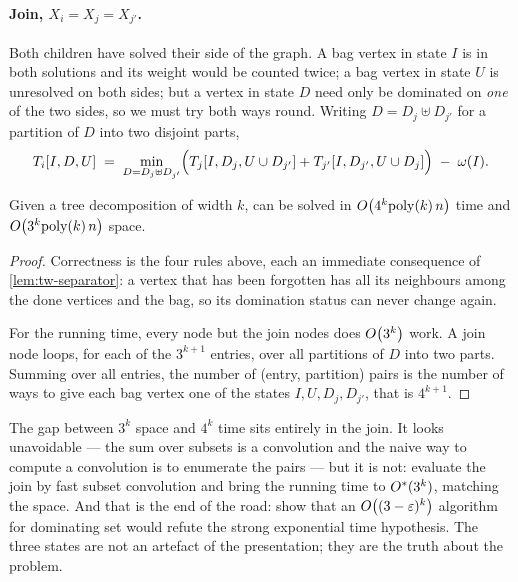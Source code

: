 \paragraph{Join, $X_i = X_j = X_{j'}$.} Both children have solved their side of
the graph. A bag vertex in state $I$ is in both solutions and its weight would
be counted twice; a bag vertex in state $U$ is unresolved on both sides; but a
vertex in state $D$ need only be dominated on \emph{one} of the two sides, so we
must try both ways round. Writing $D = D_j \uplus D_{j'}$ for a partition of $D$
into two disjoint parts,
\[ T_i[I,D,U] \;=\; \min_{D = D_j \uplus D_{j'}}
   \Bigl( T_j[I, D_j, U \cup D_{j'}] + T_{j'}[I, D_{j'}, U \cup D_j] \Bigr)
   \;-\; \omega(I). \]

\begin{theorem}\label{thm:tw-dominating-set}
Given a tree decomposition of width $k$,  can be
solved in $O\!\left(4^k \mathrm{poly}(k)\, n\right)$ time and $O\!\left(3^k \mathrm{poly}(k)\, n\right)$ space.
\end{theorem}

\begin{proof}
Correctness is the four rules above, each an immediate consequence of
\cref{lem:tw-separator}: a vertex that has been forgotten has all its
neighbours among the done vertices and the bag, so its domination status can
never change again.

For the running time, every node but the join nodes does $O\!\left(3^k\right)$ work.
A join node loops, for each of the $3^{k+1}$ entries, over all partitions of $D$
into two parts. Summing over all entries, the number of (entry, partition) pairs
is the number of ways to give each bag vertex one of the states
$I, U, D_j, D_{j'}$, that is $4^{k+1}$.
\end{proof}

\begin{intuition}
The gap between $3^k$ space and $4^k$ time sits entirely in the join. It looks
unavoidable --- the sum over subsets is a convolution and the naive way to
compute a convolution is to enumerate the pairs --- but it is not:
\citet{VanRooijBodlaenderRossmanith2009} evaluate the join by fast subset
convolution and bring the running time to $O^{*}(3^k)$, matching the space.
And that is the end of the road: \citet{LokshtanovMarxSaurabh2018} show that an
$O\!\left((3-\varepsilon)^k\right)$ algorithm for dominating set would refute the strong
exponential time hypothesis. The three states are not an artefact of the
presentation; they are the truth about the problem.
\end{intuition}

